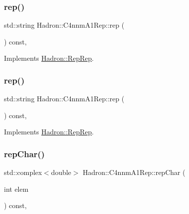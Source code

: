 \subsubsection{\texorpdfstring{rep()}{rep()}\hspace{0.1cm}{\footnotesize\ttfamily [2/3]}}
{\footnotesize\ttfamily std\+::string Hadron\+::\+C4nnm\+A1\+Rep\+::rep (\begin{DoxyParamCaption}{ }\end{DoxyParamCaption}) const\hspace{0.3cm}{\ttfamily [inline]}, {\ttfamily [virtual]}}



Implements \mbox{\hyperlink{structHadron_1_1RepRep_ab3213025f6de249f7095892109575fde}{Hadron\+::\+Rep\+Rep}}.

\mbox{\label{structHadron_1_1C4nnmA1Rep_a9d7705f3d1e605e81c8c5a603bffb361}} 
\subsubsection{\texorpdfstring{rep()}{rep()}\hspace{0.1cm}{\footnotesize\ttfamily [3/3]}}
{\footnotesize\ttfamily std\+::string Hadron\+::\+C4nnm\+A1\+Rep\+::rep (\begin{DoxyParamCaption}{ }\end{DoxyParamCaption}) const\hspace{0.3cm}{\ttfamily [inline]}, {\ttfamily [virtual]}}



Implements \mbox{\hyperlink{structHadron_1_1RepRep_ab3213025f6de249f7095892109575fde}{Hadron\+::\+Rep\+Rep}}.

\mbox{\label{structHadron_1_1C4nnmA1Rep_a369d43e2f70764875daf2967ab976dad}} 
\subsubsection{\texorpdfstring{repChar()}{repChar()}\hspace{0.1cm}{\footnotesize\ttfamily [1/2]}}
{\footnotesize\ttfamily std\+::complex$<$double$>$ Hadron\+::\+C4nnm\+A1\+Rep\+::rep\+Char (\begin{DoxyParamCaption}\item[{int}]{elem }\end{DoxyParamCaption}) const\hspace{0.3cm}{\ttfamily [inline]}, {\ttfamily [virtual]}}



